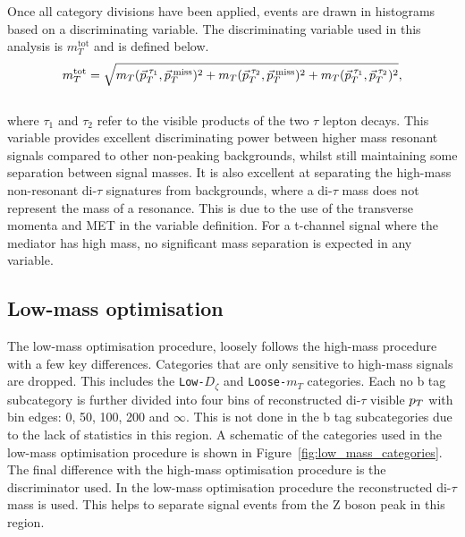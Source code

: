 Once all category divisions have been applied, events are drawn in histograms based on a discriminating variable.
The discriminating variable used in this analysis is $m_{T}^{\text{tot}}$ and is defined below. \\
\begin{equation}
m_{T}^\text{tot} = \sqrt{m_{T}(\vec{p}_{T}^{\hspace{2pt}\tau_1},\vec{p}_{T}^{\hspace{2pt}\text{miss}})^2 +  m_{T}(\vec{p}_{T}^{\hspace{2pt}\tau_2},\vec{p}_{T}^{\hspace{2pt}\text{miss}})^2 + m_{T}(\vec{p}_{T}^{\hspace{2pt}\tau_1},\vec{p}_{T}^{\hspace{2pt}\tau_2})^2},
\label{eqn:mt_tot}
\end{equation} \\
where $\tau_1$ and $\tau_2$ refer to the visible products of the two $\tau$ lepton decays.
This variable provides excellent discriminating power between higher mass resonant signals compared to other non-peaking backgrounds, whilst still maintaining some separation between signal masses.
It is also excellent at separating the high-mass non-resonant di-$\tau$ signatures from backgrounds, where a di-$\tau$ mass does not represent the mass of a resonance.
This is due to the use of the transverse momenta and \ac{MET} in the variable definition.
For a t-channel signal where the mediator has high mass, no significant mass separation is expected in any variable. \\

\subsection{Low-mass optimisation}

The low-mass optimisation procedure, loosely follows the high-mass procedure with a few key differences.
Categories that are only sensitive to high-mass signals are dropped.
This includes the \texttt{Low-$D_\zeta$} and \texttt{Loose-$m_{T}$} categories.
Each no b tag subcategory is further divided into four bins of reconstructed di-$\tau$ visible $p_{T}$ with bin edges: 0, 50, 100, 200 and $\infty$.
This is not done in the b tag subcategories due to the lack of statistics in this region.
A schematic of the categories used in the low-mass optimisation procedure is shown in Figure~\ref{fig:low_mass_categories}.
The final difference with the high-mass optimisation procedure is the discriminator used.
In the low-mass optimisation procedure the reconstructed di-$\tau$ mass is used.
This helps to separate signal events from the Z boson peak in this region. \\

